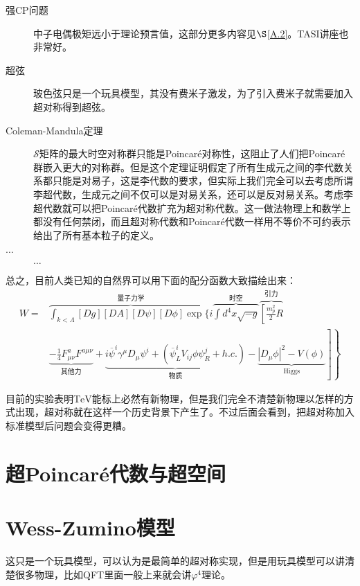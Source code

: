 \begin{description}
	\item[强CP问题] 中子电偶极矩远小于理论预言值，这部分更多内容见$\S$\ref{A.2}。TASI讲座\cite{Hook:2018dlk}也非常好。
 	\item[超弦]玻色弦只是一个玩具模型，其没有费米子激发，为了引入费米子就需要加入超对称得到超弦。
	\item[Coleman-Mandula定理] $\mathcal S$矩阵的最大时空对称群只能是Poincar\'e对称性，这阻止了人们把Poincar\'e群嵌入更大的对称群\cite{PhysRev.159.1251}。但是这个定理证明假定了所有生成元之间的李代数关系都只能是对易子，这是李代数的要求，但实际上我们完全可以去考虑所谓李超代数\cite{superlie}，生成元之间不仅可以是对易关系，还可以是反对易关系。考虑李超代数就可以把Poincar\'e代数扩充为超对称代数\cite{Haag:1974qh}。这一做法物理上和数学上都没有任何禁闭，而且超对称代数和Poincar\'e代数一样用不等价不可约表示给出了所有基本粒子的定义。
	\item [$\ldots$]$\ldots$
\end{description}

总之，目前人类已知的自然界可以用下面的配分函数大致描绘出来：
\begin{equation*}
	\begin{aligned}
		W=&\overbrace{\int_{k<\Lambda}\left[Dg\right]\left[DA\right]\left[D\psi\right]\left[D\phi\right]\exp\Bigg\{i}^{\text{量子力学}}\overbrace{\int d^{4}x\sqrt{-g}}^{\text{时空}}\overbrace{\left[\frac{m_{p}^{2}}{2}R\right.}^{\text{引力}} \\
		&\left.\left.\underbrace{-\frac{1}{4}F_{\mu\nu}^{a}F^{a\mu\nu}}_{\text{其他力}}+\underbrace{i\overline{\psi}^{i}\gamma^{\mu}D_{\mu}\psi^{i}+\left(\overline{\psi}_{L}^{i}V_{ij}\phi\psi_{R}^{j}+h.c.\right)}_{\text{物质}}-\underbrace{\left|D_{\mu}\phi\right|^{2}-V\left(\phi\right)}_{\text{Higgs}}\right]\right\}
	\end{aligned}
\end{equation*}

\PRLsep

目前的实验表明$\mathrm{TeV}$能标上必然有新物理，但是我们完全不清楚新物理以怎样的方式出现，超对称就在这样一个历史背景下产生了。不过后面会看到，把超对称加入标准模型后问题会变得更糟。

\section{超Poincar\'e代数与超空间}


\section{Wess-Zumino模型}
这只是一个玩具模型，可以认为是最简单的超对称实现，但是用玩具模型可以讲清楚很多物理，比如QFT里面一般上来就会讲$\varphi^4$理论。